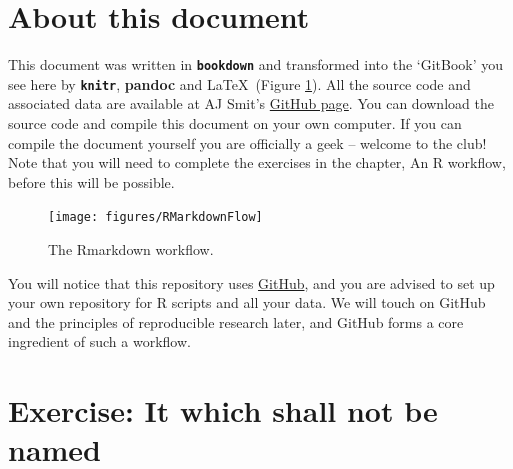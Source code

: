 \documentclass[
]{book}
\begin{document}
\hypertarget{about-this-document}{%
\section{About this document}\label{about-this-document}}

This document was written in \textbf{\texttt{bookdown}} and transformed into the `GitBook' you see here by \textbf{\texttt{knitr}}, \textbf{pandoc} and \LaTeX~(Figure \ref{fig:rmarkdown}). All the source code and associated data are available at AJ Smit's \href{https://github.com/ajsmit/Intro_R_Workshop}{GitHub page}. You can download the source code and compile this document on your own computer. If you can compile the document yourself you are officially a geek -- welcome to the club! Note that you will need to complete the exercises in the chapter, An R workflow, before this will be possible.

\begin{figure}

{\centering \texttt{[image: figures/RMarkdownFlow]} 

}

\caption{The Rmarkdown workflow.}\label{fig:rmarkdown}
\end{figure}

You will notice that this repository uses \href{https://github.com}{GitHub}, and you are advised to set up your own repository for R scripts and all your data. We will touch on GitHub and the principles of reproducible research later, and GitHub forms a core ingredient of such a workflow.

\hypertarget{exercise-it-which-shall-not-be-named}{%
\section{Exercise: It which shall not be named}\label{exercise-it-which-shall-not-be-named}}
\end{document}
